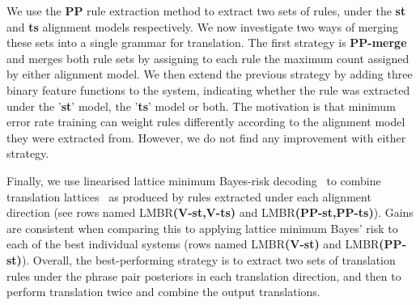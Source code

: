 We use the {\bf PP} rule extraction method to extract two sets of rules, under
the {\bf st} and {\bf ts} alignment models respectively. We now investigate two
ways of merging these sets into a single grammar for translation. The first
strategy is {\bf PP-merge} and merges both rule sets by assigning to each rule
the maximum count assigned by either alignment model. We then extend the
previous strategy by adding three binary feature functions to the system,
indicating whether the rule was extracted under the '{\bf st}' model, the
'{\bf ts}' model or both. The motivation is that minimum error rate training can
weight rules differently according to the alignment model they were extracted
from. However, we do not find any improvement with either strategy.

Finally, we use linearised lattice minimum Bayes-risk
decoding~\citep{tromble-kumar-och-macherey:2008:EMNLP,blackwood-degispert-byrne:2010:ACL,blackwood:2010:PHD}
to combine translation
lattices~\citep{degispert-iglesias-blackwood-banga-byrne:2010:CL} as produced by
rules extracted under each alignment direction (see rows named
LMBR{\bf(V-st,V-ts)} and LMBR{\bf(PP-st,PP-ts)}). Gains are consistent when
comparing this to applying lattice minimum Bayes' risk to each of the best
individual systems (rows named LMBR{\bf(V-st)} and LMBR{\bf(PP-st)}). Overall,
the best-performing strategy is to extract two sets of translation rules under
the phrase pair posteriors in each translation direction, and then to perform
translation twice and combine the output translations.

